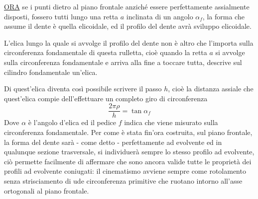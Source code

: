 \documentclass[a4paper, 15pt]{article}
\begin{document}
\begin{adjustwidth}{2in}{}
		\underline{ORA} se i punti dietro al piano frontale anziché essere perfettamente assialmente disposti, fossero tutti lungo una retta $a$ inclinata di un angolo $\alpha_f$, la forma che assume il dente è quella elicoidale, ed il profilo del dente avrà sviluppo elicoidale. \newline 
		
		L'elica lungo la quale si avvolge il profilo del dente non è altro che l'importa sulla circonferenza fondamentale di questa rulletta, cioè quando la retta $a$ si avvolge sulla circonferenza fondamentale e arriva alla fine a toccare tutta, descrive sul cilindro fondamentale un'elica. 
		
		Di quest'elica diventa così possibile scrivere il passo $h$, cioè la distanza assiale che quest'elica compie dell'effettuare un completo giro di circonferenza 
		\[\dfrac{2\pi\rho}{h} = \tan\alpha_f\]
		Dove $\alpha$ è l'angolo d'elica ed il pedice $f$ indica che viene misurato sulla circonferenza fondamentale.  
\newpage		
		Per come è stata fin'ora costruita, sul piano frontale, la forma del dente sarà - come detto - perfettamente ad evolvente ed in qualunque sezione trasversale, si individuerà sempre lo stesso profilo ad evolvente, ciò permette facilmente di affermare che sono ancora valide tutte le proprietà dei profili ad evolvente coniugati: il cinematismo avviene sempre come rotolamento senza strisciamento di ude circonferenza primitive  che ruotano intorno all'asse ortogonali al piano frontale.   
\end{adjustwidth}
\end{document}
